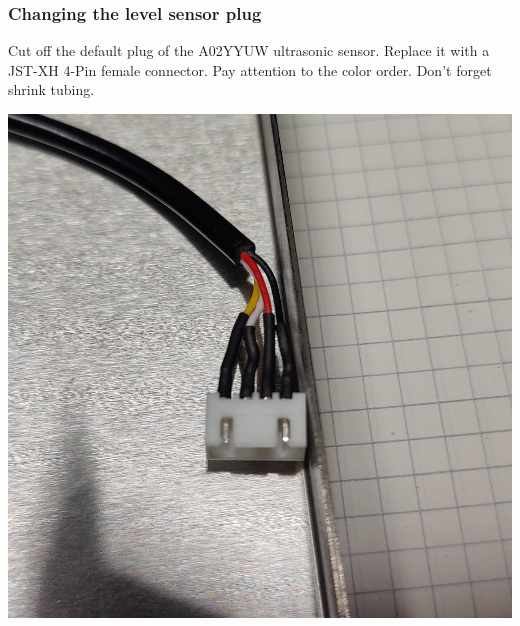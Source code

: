 \documentclass[]{article}
\begin{document}
\subsubsection{Changing the level sensor plug}
\begin{minipage}[t]{0.5\linewidth}
	\vspace{0pt}
	Cut off the default plug of the A02YYUW ultrasonic sensor. Replace it with a JST-XH 4-Pin female connector. Pay attention to the color order. Don't forget shrink tubing.
\end{minipage}
\hfill
\begin{minipage}[t]{0.4\linewidth}
	\vspace{0pt}
	\includegraphics[width=\linewidth]{images/02_wiring/03_lid_sensor_plug.jpg}
\end{minipage}
\end{document}
